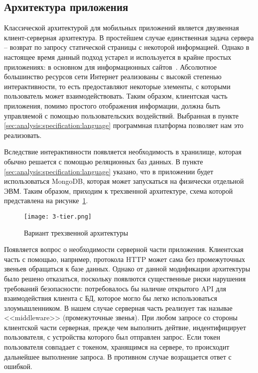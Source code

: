 \subsection{Архитектура приложения}
\label{sec:design:architecture}

Классической архитектурой для мобильных приложений является двузвенная клиент-серверная архитектура. В простейшем случае единственная задача сервера -- возврат по запросу статической страницы с некоторой информацией. Однако в настоящее время данный подход устарел и используется в крайне простых приложениях: в основном для информационных сайтов~\cite{from_sites_to_webapps}. Абсолютное большинство ресурсов сети Интернет реализованы с высокой степенью интерактивности, то есть предоставляют некоторые элементы, с которыми пользователь может взаимодействовать. Таким образом, клиентская часть приложения, помимо простого отображения информации, должна быть управляемой с помощью пользовательских воздействий. Выбранная в пункте \ref{sec:analysis:specification:language} программная платформа позволяет нам это реализовать.

Вследствие интерактивности появляется необходимость в хранилище, которая обычно решается с помощью реляционных баз данных. В пункте \ref{sec:analysis:specification:language} указано, что в приложении будет использоваться MongoDB, которая может запускаться на физически отдельной ЭВМ. Таким образом, приходим к трехзвенной архитектуре, схема которой представлена на рисунке~\ref{fig:analysis:specification:language:3-tier}.

\begin{figure}[ht]
\centering
	\texttt{[image: 3-tier.png]}
	\caption{Вариант трехзвенной архитектуры}
	\label{fig:analysis:specification:language:3-tier}
\end{figure}

Появляется вопрос о необходимости серверной части приложения. Клиентская часть с помощью, например, протокола HTTP может сама без промежуточных звеньев обращаться к базе данных. Однако от данной модификации архитектуры было решено отказаться, поскольку появлются существенные риски нарушения требований безопасности: потребовалось бы наличие открытого API для взаимодействия клиента с БД, которое могло бы легко использоваться злоумышленником. В нашем случае серверная часть реализует так называе <<middleware>> (промежуточные звенья). При любом запросе со стороны клиентской части серверная, прежде чем выполнить дейтвие, индентифицирует пользователя, с устройства которого был отправлен запрос. Если токен пользователя совпадает с токеном, хранящимся на сервере, то происходит дальнейшее выполнение запроса. В противном случае возращается ответ с ошибкой.
